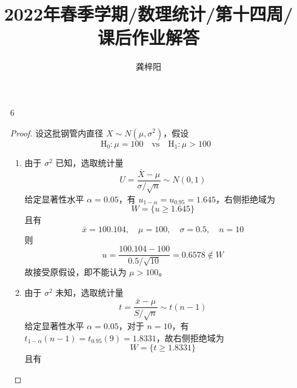 \documentclass[normal,cn]{elegantnote}
\title{2022年春季学期/数理统计/第十四周/课后作业解答}
\author{龚梓阳}
\date{\zhtoday}
\begin{document}
\maketitle
\begin{enumerate}
    \item[6]
        \begin{proof}
            设这批钢管内直径 $X\sim N\left(\mu,\sigma^{2}\right)$，假设
            \begin{equation*}
                \mathrm{H}_{0}:\mu=100\quad\text{vs}\quad\mathrm{H}_{1}:\mu>100
            \end{equation*}
            \begin{enumerate}
                \item 由于 $\sigma^{2}$ 已知，选取统计量
                      \begin{equation*}
                          U=\frac{\bar{X}-\mu}{\sigma/\sqrt{n}}\sim N(0,1)
                      \end{equation*}
                      给定显著性水平 $\alpha=0.05$，有 $u_{1-\alpha}=u_{0.95}=1.645$，右侧拒绝域为
                      \begin{equation*}
                          W=\{u \geq 1.645\}
                      \end{equation*}
                      且有
                      \begin{equation*}
                          \bar{x}=100.104,\quad\mu=100,\quad \sigma=0.5,\quad n=10
                      \end{equation*}
                      则
                      \begin{equation*}
                          u=\frac{100.104-100}{0.5/\sqrt{10}}=0.6578\notin W
                      \end{equation*}
                      故接受原假设，即不能认为 $\mu>100$。
                \item 由于 $\sigma^{2}$ 未知，选取统计量
                      \begin{equation*}
                          t=\frac{\bar{x}-\mu}{S/\sqrt{n}}\sim t(n-1)
                      \end{equation*}
                      给定显著性水平 $\alpha=0.05$，对于 $n=10$，有 $t_{1-\alpha}(n-1)=t_{0.95}(9)=1.8331$，故右侧拒绝域为
                      \begin{equation*}
                          W=\{t\geq 1.8331\}
                      \end{equation*}
                      且有

\end{enumerate}
\end{proof}
\end{enumerate}
\end{document}
